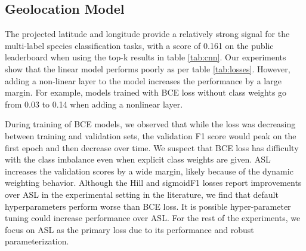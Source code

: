 \subsection{Geolocation Model}

The projected latitude and longitude provide a relatively strong signal for the multi-label species classification tasks, with a score of 0.161 on the public leaderboard when using the top-k results in table \ref{tab:cnn}.
Our experiments show that the linear model performs poorly as per table \ref{tab:losses}.
However, adding a non-linear layer to the model increases the performance by a large margin.
For example, models trained with BCE loss without class weights go from 0.03 to 0.14 when adding a nonlinear layer.

During training of BCE models, we observed that while the loss was decreasing between training and validation sets, the validation F1 score would peak on the first epoch and then decrease over time.
We suspect that BCE loss has difficulty with the class imbalance even when explicit class weights are given.
ASL increases the validation scores by a wide margin, likely because of the dynamic weighting behavior.
Although the Hill and sigmoidF1 losses report improvements over ASL in the experimental setting in the literature, we find that default hyperparameters perform worse than BCE loss.
It is possible hyper-parameter tuning could increase performance over ASL.
For the rest of the experiments, we focus on ASL as the primary loss due to its performance and robust parameterization.

